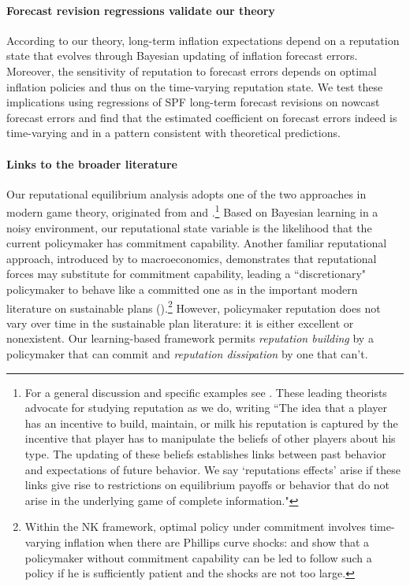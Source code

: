 \documentclass[12pt,letter,leqno]{article}
\theoremstyle{asn}
\theoremstyle{lem}
\theoremstyle{slem}
\theoremstyle{prop}
\theoremstyle{appprop}
\theoremstyle{rem}
\theoremstyle{defn}
\begin{document}
\paragraph{Forecast revision regressions validate our theory} According to our theory, long-term inflation expectations depend on a reputation state that evolves through Bayesian updating of inflation forecast errors. Moreover, the sensitivity of reputation to forecast errors depends on optimal inflation policies and thus on the time-varying reputation state. We test these implications using regressions of SPF long-term forecast revisions on nowcast forecast errors and find that the estimated coefficient on forecast errors indeed is time-varying and in a pattern consistent with theoretical predictions. 




\paragraph{Links to the broader literature} Our reputational equilibrium analysis adopts one of the two approaches in modern game theory, originated 
 from \cite{milgrom_limit_1982} and \cite{kreps_reputation_1982}.\footnote{For a general discussion and specific examples see \cite{mailath_repeated_2006}. These leading theorists advocate for studying reputation as we do, writing ``The idea that a player has an incentive to build, maintain, or milk his reputation is captured by the incentive that player has to manipulate the beliefs of other players about his type. The updating of these beliefs establishes links between past behavior and expectations of future behavior. We say `reputations effects' arise if these links give rise to restrictions on equilibrium payoffs or behavior that do not arise in the underlying game of complete information."} Based on Bayesian learning in a noisy environment, our reputational state variable is the likelihood that the current policymaker has commitment capability. Another familiar reputational approach, introduced by \cite{barro_rules_1983} to macroeconomics, demonstrates that reputational forces may substitute for commitment capability, leading a ``discretionary" policymaker to behave like a committed one as in the important modern literature on sustainable plans (\cite{chari_sustainable_1990}).\footnote{Within the NK framework, optimal policy under commitment involves time-varying inflation when there are Phillips curve shocks:  \cite{KUROZUMI20081277} and \cite{LOISEL20083718} show that a policymaker without commitment capability can be led to follow such a policy if he is sufficiently patient and the shocks are not too large.} However, policymaker reputation does not vary over time in the sustainable plan literature: it is either excellent or nonexistent. Our learning-based framework permits \textit{reputation building} by a policymaker that can commit and \textit{reputation dissipation} by one that can't.
\end{document}
